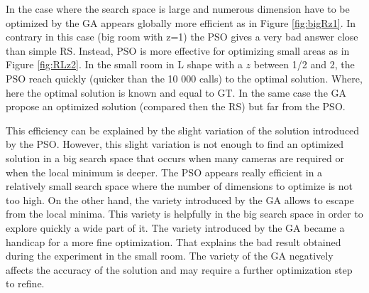 In the case where the search space is large and numerous dimension have to be optimized by the GA appears globally more efficient as in Figure \ref{fig:bigRz1}. In contrary in this case (big room with z=1) the PSO gives a very bad answer close than simple RS.
 Instead, PSO is more effective for optimizing small areas as in Figure \ref{fig:RLz2}. In the small room in L shape with a $z$ between 1/2 and 2, the PSO reach quickly (quicker than the 10 000 calls) to the optimal solution. Where, here the optimal solution is known and equal to GT. In the same case the GA propose an optimized solution (compared then the RS) but far from the PSO.
 
 This efficiency can be explained by the slight variation of the solution introduced by the PSO. However, this slight variation is not enough to find an optimized solution in a big search space that occurs when many cameras are required or when the local minimum is deeper. The PSO appears really efficient in a relatively small search space where the number of dimensions to optimize is not too high.
 On the other hand, the variety  introduced by the GA allows to escape from  the local minima. This variety is helpfully  in the big search space in order to explore quickly a wide part of it. The variety introduced by the GA became a handicap for a more fine optimization. That explains the bad result obtained during the experiment in the small room. The variety of the GA negatively affects the accuracy of the solution and may require a further optimization step to refine. 
 
% 

